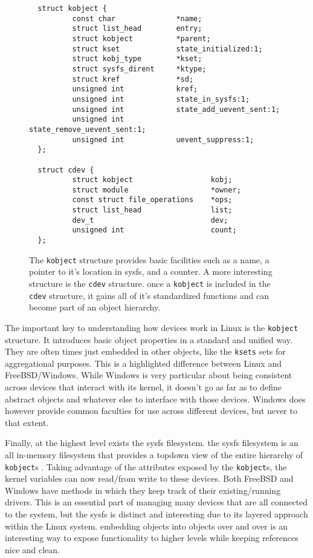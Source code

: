 \documentclass[10pt,draftclsnofoot,onecolumn]{IEEEtran}
\begin{document}
\begin{figure}[h]
\begin{lstlisting}
  struct kobject {
          const char              *name;
          struct list_head        entry;
          struct kobject          *parent;
          struct kset             state_initialized:1;
          struct kobj_type        *kset;
          struct sysfs_dirent     *ktype;
          struct kref             *sd;
          unsigned int            kref;
          unsigned int            state_in_sysfs:1;
          unsigned int            state_add_uevent_sent:1;
          unsigned int            state_remove_uevent_sent:1;
          unsigned int            uevent_suppress:1;
  };

  struct cdev {
          struct kobject                  kobj;
          struct module                   *owner;
          const struct file_operations    *ops;
          struct list_head                list;
          dev_t                           dev;
          unsigned int                    count;
  };
\end{lstlisting}
\centering
\captionsetup{justification=centering}
\caption{
  The \texttt{kobject} structure provides basic facilities such as a name, a pointer to it's location in sysfs, and a counter.
  A more interesting structure is the \texttt{cdev} structure.
  once a \texttt{kobject} is included in the \texttt{cdev} structure, it gains all of it's standardized functions and can become part of an object hierarchy.
}
\label{code:kobject_struct}
\end{figure}

\par The important key to understanding how devices work in Linux is the \texttt{kobject} structure.
It introduces basic object properties in a standard and unified way.
They are often times just embedded in other objects, like the \texttt{ksets} sets for aggregational purposes.
This is a highlighted difference between Linux and FreeBSD/Windows.
While Windows is very particular about being consistent across devices that interact with its kernel, it doesn't go as far as to define abstract objects and whatever else to interface with those devices.
Windows does however provide common faculties for use across different devices, but never to that extent.

\par Finally, at the highest level exists the sysfs filesystem.
the sysfs filesystem is an all in-memory filesystem that provides a topdown view of the entire hierarchy of \texttt{kobject}s \cite{linux:1}.
Taking advantage of the attributes exposed by the \texttt{kobject}s, the kernel variables can now read/from write to these devices.
Both FreeBSD and Windows have methods in which they keep track of their existing/running drivers.
This is an essential part of managing many devices that are all connected to the system, but the sysfs is distinct and interesting due to its layered approach within the Linux system.
embedding objects into objects over and over is an interesting way to expose functionality to higher levels while keeping references nice and clean.
\end{document}
